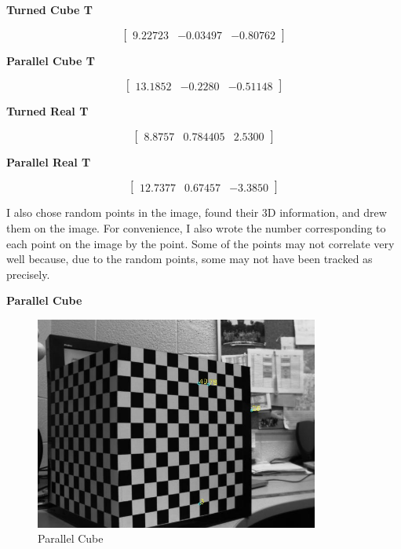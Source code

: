 \documentclass[10pt,a4paper]{article}
\begin{document}
\textbf{Turned Cube T}

\begin{equation*}
\begin{bmatrix}
9.22723 & -0.03497 & -0.80762
\end{bmatrix}
\end{equation*}

\textbf{Parallel Cube T} 

\begin{equation*}
\begin{bmatrix}
13.1852& -0.2280& -0.51148
\end{bmatrix}
\end{equation*}

\textbf{Turned Real T} 

\begin{equation*}
\begin{bmatrix}
8.8757& 0.784405& 2.5300
\end{bmatrix}
\end{equation*}

\textbf{Parallel Real T} 

\begin{equation*}
\begin{bmatrix}
12.7377& 0.67457& -3.3850
\end{bmatrix}
\end{equation*}


I also chose random points in the image, found their 3D information, and drew them on the image. For convenience, I also wrote the number corresponding to each point on the image by the point. Some of the points may not correlate very well because, due to the random points, some may not have been tracked as precisely.  

\textbf{Parallel Cube}

\begin{figure}[H]
\centering
\includegraphics[height=7cm,keepaspectratio]{parallelCube_3dinfo}
\caption{Parallel Cube}
\end{figure}
\end{document}
